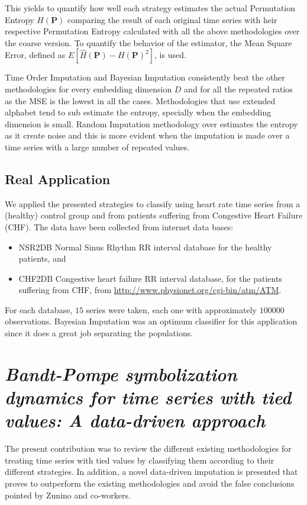 \documentclass[11pt]{article}
\begin{document}
This yields to quantify how well each strategy estimates the actual Permutation Entropy $H(\bm P)$ comparing the result of each original time series with  heir respective Permutation Entropy calculated with all the above methodologies over the coarse version.
To quantify the behavior of the estimator, the Mean Square Error, defined as $E[\hat{H}(\bm P) - H(\bm P)^2]$, is used.

Time Order Imputation and Bayesian Imputation consistently beat the other methodologies for every embedding dimension $D$ and for all the repeated ratios as the MSE is the lowest in all the cases.
Methodologies that use extended alphabet tend to sub estimate the entropy, specially when the embedding dimension is small. 
Random Imputation methodology over estimates the entropy as it create noise and this is more evident when the imputation is made over a time series with a large number of repeated values.

\subsection*{Real Application}

We applied the presented strategies to classify using heart rate time series from a (healthy) control group and from patients suffering from Congestive Heart Failure (CHF). 
The data have been collected from internet data bases: 
\begin{itemize}
    \item NSR2DB Normal Sinus Rhythm RR interval database for the healthy patients, and
    \item CHF2DB Congestive heart failure RR interval database, for the patients suffering from CHF, from \url{http://www.physionet.org/cgi-bin/atm/ATM}.
\end{itemize}
For each database, $15$ series were taken, each one with approximately $100000$ observations.
Bayesian Imputation was an optimum classifier for this application since it does a great job separating the populations.
\newpage

\section*{\textbf{\textit{Bandt-Pompe symbolization dynamics for time series with tied values: A data-driven approach}}~\cite{traversaro2018bandt}}

The present contribution was to review the different existing methodologies for treating time series with tied values by classifying them according to their different strategies. 
In addition, a novel data-driven imputation is presented that proves to outperform the existing methodologies and avoid the false conclusions pointed by Zunino and co-workers.
\end{document}
